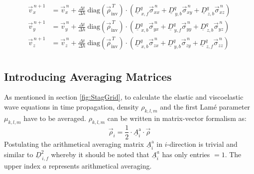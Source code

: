 \documentclass[pdftex,a4paper,parskip,listof=totoc,bibliography=totoc,onehalfspacing,12pt]{scrreprt}
\begin{document}
\begin{align*}
	\vec{v}_x^{\,n+1} &= \vec{v}_x^{\,n} + \frac{\Delta t}{\Delta h} ~ \mathrm{diag} \left( \vec{\rho}_\mathrm{inv}^{\,T} \right) \cdot \left( \underline{D}_{\,x,f}^q \vec{\sigma}_{xx}^{\,n} + \underline{D}_{\,y,b}^q \vec{\sigma}_{xy}^{\,n} + \underline{D}_{\,z,b}^q \vec{\sigma}_{xz}^{\,n} \right)\\
	\vec{v}_y^{\,n+1} &= \vec{v}_y^{\,n} + \frac{\Delta t}{\Delta h} ~ \mathrm{diag} \left( \vec{\rho}_\mathrm{inv}^{\,T} \right) \cdot \left( \underline{D}_{\,x,b}^q \vec{\sigma}_{yx}^{\,n} + \underline{D}_{\,y,f}^q \vec{\sigma}_{yy}^{\,n} + \underline{D}_{\,z,b}^q \vec{\sigma}_{yz}^{\,n} \right)\\
	\vec{v}_z^{\,n+1} &= \vec{v}_z^{\,n} + \frac{\Delta t}{\Delta h} ~ \mathrm{diag} \left( \vec{\rho}_\mathrm{inv}^{\,T} \right) \cdot \left( \underline{D}_{\,x,b}^q \vec{\sigma}_{zx}^{\,n} + \underline{D}_{\,y,b}^q \vec{\sigma}_{zy}^{\,n} + \underline{D}_{\,z,f}^q \vec{\sigma}_{zz}^{\,n} \right)\\
\end{align*}

\subsection{Introducing Averaging Matrices} \label{sec:Introducing_Averaging_Matrices}
As mentioned in section \ref{fig:StagGrid}, to calculate the elastic and viscoelastic wave equations in time propagation, density $\rho_{k,l,m}$ and the first Lam\'{e} parameter $\mu_{k,l,m}$ have to be averaged. $\rho_{k,l,m}$ can be written in matrix-vector formalism as:
\begin{equation*}
\vec{\rho}_{i}=\frac{1}{2}\cdot\underline{A}^{\text{a}}_{i} \cdot\vec{\rho}	
\end{equation*}
Postulating the arithmetical averaging matrix $\underline{A}^{\text{a}}_{i}$ in $i$-direction is trivial and similar to $\underline{D}_{\,i,f}^2$ whereby it should be noted that $\underline{A}^{a}_{i}$ has only entries $=1$. The upper index $a$ represents arithmetical averaging.
\end{document}
